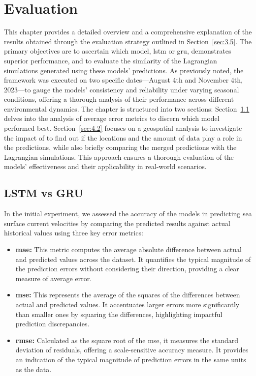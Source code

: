 \graphicspath{{content/chapters/4_evaluation/evaluation_figures}}

\chapter{Evaluation}
\label{chp:evaluation}

This chapter provides a detailed overview and a comprehensive explanation of the results obtained through the evaluation strategy outlined in Section~\ref{sec:3.5}. The primary objectives are to ascertain which model, \acrshort{lstm} or \acrshort{gru}, demonstrates superior performance, and to evaluate the similarity of the Lagrangian simulations generated using these models' predictions. As previously noted, the framework was executed on two specific dates—August 4th and November 4th, 2023—to gauge the models' consistency and reliability under varying seasonal conditions, offering a thorough analysis of their performance across different environmental dynamics. The chapter is structured into two sections: Section~\ref{sec:4.1} delves into the analysis of average error metrics to discern which model performed best. Section~\ref{sec:4.2} focuses on a geospatial analysis to investigate the impact of to find out if the locations and the amount of data play a role in the predictions, while also briefly comparing the merged predictions with the Lagrangian simulations. This approach ensures a thorough evaluation of the models' effectiveness and their applicability in real-world scenarios.

\section{LSTM vs GRU}
\label{sec:4.1}

In the initial experiment, we assessed the accuracy of the models in predicting sea surface current velocities by comparing the predicted results against actual historical values using three key error metrics:
\begin{itemize}
    \item \textbf{\acrshort{mae}:} This metric computes the average absolute difference between actual and predicted values across the dataset. It quantifies the typical magnitude of the prediction errors without considering their direction, providing a clear measure of average error.
    \item \textbf{\acrshort{mse}:} This represents the average of the squares of the differences between actual and predicted values. It accentuates larger errors more significantly than smaller ones by squaring the differences, highlighting impactful prediction discrepancies.
    \item \textbf{\acrshort{rmse}:} Calculated as the square root of the \acrshort{mse}, it measures the standard deviation of residuals, offering a scale-sensitive accuracy measure. It provides an indication of the typical magnitude of prediction errors in the same units as the data.
\end{itemize}

